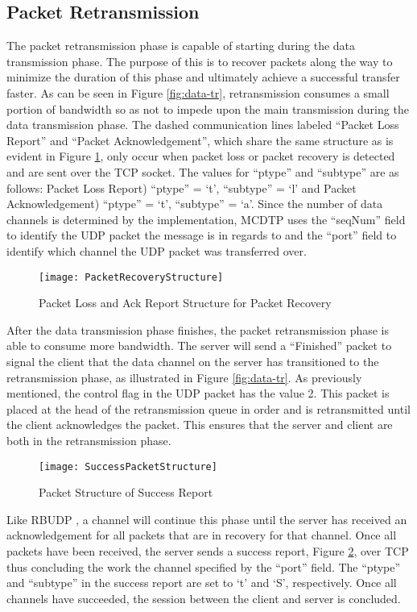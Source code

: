 \subsection{Packet Retransmission}\label{subsec:pack-retr}

The packet retransmission phase is capable of starting during the data transmission phase. The purpose of this is to recover packets along the way to minimize the duration of this phase and ultimately achieve a successful transfer faster. As can be seen in Figure \ref{fig:data-tr}, retransmission consumes a small portion of bandwidth so as not to impede upon the main transmission during the data transmission phase. The dashed communication lines labeled ``Packet Loss Report'' and ``Packet Acknowledgement'', which share the same structure as is evident in Figure \ref{fig:pack-rec-struct}, only occur when packet loss or packet recovery is detected and are sent over the TCP socket. The values for ``ptype'' and ``subtype'' are as follows:  Packet Loss Report) ``ptype'' = `t', ``subtype'' = `l' and Packet Acknowledgement) ``ptype'' = `t', ``subtype'' = `a'. Since the number of data channels is determined by the implementation, MCDTP uses the ``seqNum'' field to identify the UDP packet the message is in regards to and the ``port'' field to identify which channel the UDP packet was transferred over.

\begin{figure}[ht]
\centering
\texttt{[image: PacketRecoveryStructure]}
\caption{Packet Loss and Ack Report Structure for Packet Recovery}
\label{fig:pack-rec-struct}
\end{figure}

After the data transmission phase finishes, the packet retransmission phase is able to consume more bandwidth. The server will send a ``Finished'' packet to signal the client that the data channel on the server has transitioned to the retransmission phase, as illustrated in Figure \ref{fig:data-tr}. As previously mentioned, the control flag in the UDP packet has the value 2. This packet is placed at the head of the retransmission queue in order and is retransmitted until the client acknowledges the packet. This ensures that the server and client are both in the retransmission phase.

\begin{figure}[ht]
\centering
\texttt{[image: SuccessPacketStructure]}
\caption{Packet Structure of Success Report}
\label{fig:success-struct}
\end{figure}

Like RBUDP \cite{He2002}, a channel will continue this phase until the server has received an acknowledgement for all packets that are in recovery for that channel. Once all packets have been received, the server sends a success report, Figure \ref{fig:success-struct}, over TCP thus concluding the work the channel specified by the ``port'' field. The ``ptype'' and ``subtype'' in the success report are set to `t' and `S', respectively. Once all channels have succeeded, the session between the client and server is concluded.